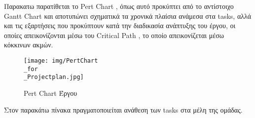 \documentclass{../ol-softwaremanual}
\begin{document}
	
	\newpage 
	
	\flushleft
	Παρακατω παρατίθεται το \en Pert Chart \gr, όπως αυτό προκύπτει από το αντίστοιχο \en Gantt Chart \gr και αποτυπώνει σχηματικά τα χρονικά πλαίσια ανάμεσα στα \en tasks\gr, αλλά και τις εξαρτήσεις που προκύπτουν κατά την διαδικασία ανάπτυξης του έργου, οι οποίες απεικονίζονται μέσω του \en Critical Path \gr, το οποίο απεικονίζεται μέσω κόκκινων ακμών.
	
	
	\begin{figure}[htbp!]
		
		\texttt{[image: img/PertChart\\\_for\\\_Projectplan.jpg]}
		\caption{ \en Pert Chart \gr Έργου}
	\end{figure}
	
	\newpage
	
	\vspace{20pt}
	\flushleft
	Στον παρακάτω πίνακα πραγματοποιείται ανάθεση των \en tasks \gr στα μέλη της ομάδας.		
	
\end{document}
